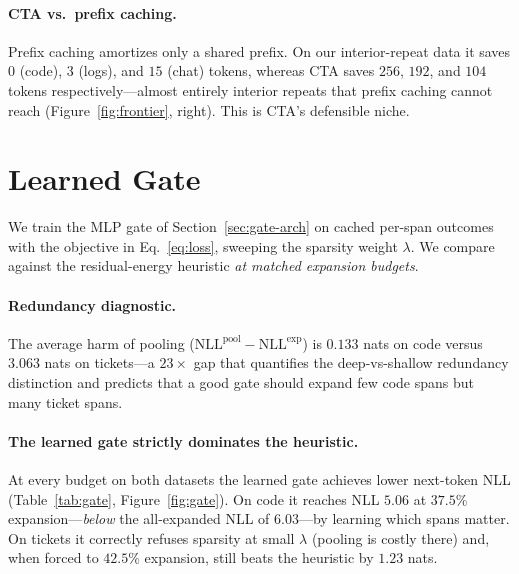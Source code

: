 \documentclass[11pt]{article}
\begin{document}
\paragraph{CTA vs.\ prefix caching.} Prefix caching amortizes only a shared prefix. On our
interior-repeat data it saves $0$ (code), $3$ (logs), and $15$ (chat) tokens, whereas CTA
saves $256$, $192$, and $104$ tokens respectively---almost entirely interior repeats that
prefix caching cannot reach (Figure~\ref{fig:frontier}, right). This is CTA's defensible
niche.

\section{Learned Gate}
\label{sec:gate}

We train the MLP gate of Section~\ref{sec:gate-arch} on cached per-span outcomes with the
objective in Eq.~\eqref{eq:loss}, sweeping the sparsity weight $\lambda$. We compare
against the residual-energy heuristic \emph{at matched expansion budgets}.

\paragraph{Redundancy diagnostic.} The average harm of pooling
($\mathrm{NLL}^{\text{pool}}-\mathrm{NLL}^{\text{exp}}$) is $0.133$ nats on code versus
$3.063$ nats on tickets---a $23\times$ gap that quantifies the deep-vs-shallow redundancy
distinction and predicts that a good gate should expand few code spans but many ticket
spans.

\paragraph{The learned gate strictly dominates the heuristic.} At every budget on both
datasets the learned gate achieves lower next-token NLL (Table~\ref{tab:gate},
Figure~\ref{fig:gate}). On code it reaches NLL $5.06$ at $37.5\%$ expansion---\emph{below}
the all-expanded NLL of $6.03$---by learning which spans matter. On tickets it correctly
refuses sparsity at small $\lambda$ (pooling is costly there) and, when forced to $42.5\%$
expansion, still beats the heuristic by $1.23$ nats.
\end{document}
